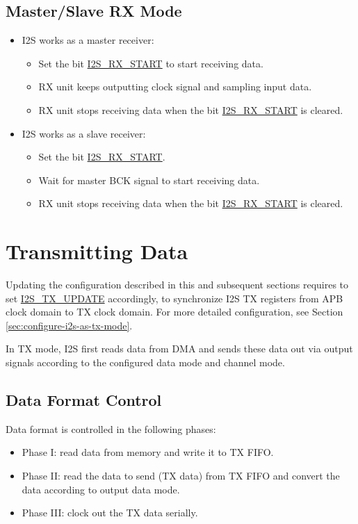 \documentclass[main\_\_CN.tex]{subfiles}
\begin{document}
\subsection{Master/Slave RX Mode}
\begin{itemize}
    \item I2S works as a master receiver:
    \begin{itemize}
        \item Set the bit  \hyperref[fielddesc:I2SRXSTART]{I2S\_RX\_START} to start receiving data.
        \item RX unit keeps outputting clock signal and sampling input data.
        \item RX unit stops receiving data when the bit  \hyperref[fielddesc:I2SRXSTART]{I2S\_RX\_START} is cleared.
    \end{itemize}
    \item I2S works as a slave receiver:
     \begin{itemize}
        \item Set the bit  \hyperref[fielddesc:I2SRXSTART]{I2S\_RX\_START}.
        \item Wait for master BCK signal to start receiving data.
        \item RX unit stops receiving data when the bit  \hyperref[fielddesc:I2SRXSTART]{I2S\_RX\_START} is cleared.
    \end{itemize}
\end{itemize}

\section{Transmitting Data}\label{TXCHAN}

\begin{tiplisting}
Updating the configuration described in this and subsequent sections requires to set  \hyperref[fielddesc:I2STXUPDATE]{I2S\_TX\_UPDATE} accordingly, to synchronize I2S TX registers from APB clock domain to TX clock domain. For more detailed configuration, see Section  \ref{sec:configure-i2s-as-tx-mode}.
\end{tiplisting}
\vspace{-2em}
In TX mode, I2S first reads data from DMA and sends these data out via output signals according to the configured data mode and channel mode.
\subsection{Data Format Control}
Data format is controlled in the following phases:
\begin{itemize}
    \item Phase I: read data from memory and write it to TX FIFO.
    \item Phase II: read the data to send (TX data) from TX FIFO and convert the data according to output data mode.
    \item Phase III: clock out the TX data serially.
\end{itemize}
\end{document}
